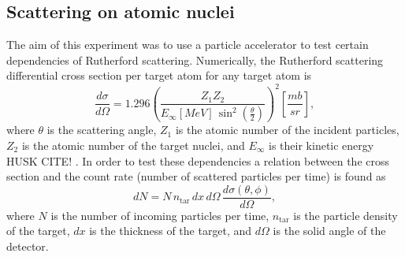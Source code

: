 \subsection{Scattering on atomic nuclei}
The aim of this experiment was to use a particle accelerator to test certain dependencies of Rutherford scattering. Numerically, the Rutherford scattering differential cross section per target atom for any target atom is
\begin{equation}
\frac{d\sigma}{d\Omega} = 1.296 \left( \frac{Z_1 Z_2}{E_\infty [MeV] \, \sin^2 \left(\frac{\theta}{2} \right) }\right)^2\left[\frac{mb}{sr}\right],
\end{equation}
where $\theta$ is the scattering angle, $Z_1$  is the atomic number of the incident particles, $Z_2$ is the atomic number of the target nuclei, and $E_{\infty}$ is their kinetic energy HUSK CITE!%
. 
In order to test these dependencies a relation between the cross section and the count rate (number of scattered particles per time) is found as
\begin{equation}
dN = N \, n_{\text{tar}} \, dx \,d\Omega \, \frac{d\sigma(\theta,\phi)}{d\Omega},
\end{equation}
where $N$ is the number of incoming particles per time, $n_\text{tar}$ is the particle density of the target, $dx$ is the thickness of the target, and $d\Omega$ is the solid angle of the detector.


